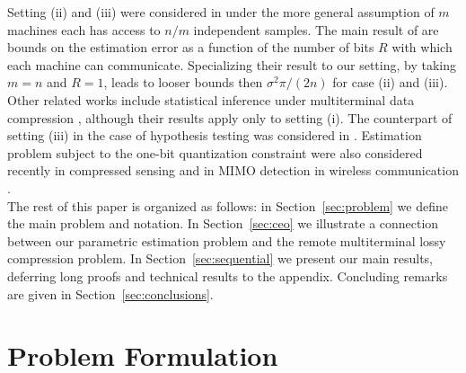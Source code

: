 \documentclass[letterpaper, conference]{IEEEtran}      %
\begin{document}
Setting (ii) and (iii) were considered in 
\cite{zhang2013information} under the more general assumption of $m$ machines each has access to $n/m$ independent samples. The main result of \cite{zhang2013information} are bounds on the estimation error as a function of the number of bits $R$ with which each machine can communicate. Specializing their result to our setting, by taking $m=n$ and $R=1$, leads to looser bounds then $\sigma^2\pi/(2n)$ for case (ii) and (iii). 
Other related works include statistical inference under multiterminal data compression \cite{han1987hypothesis, zhang1988estimation}, although their results apply only to setting (i). The counterpart of setting (iii) in the case of hypothesis testing was considered in \cite{52470}.
%
Estimation problem subject to the one-bit quantization constraint were also considered recently in compressed sensing \cite{boufounos20081,baraniuk2017exponential} and in MIMO detection in wireless communication \cite{singh2009limits}. \\

The rest of this paper is organized as follows: in Section~\ref{sec:problem} we define 
the main problem and notation. In Section~\ref{sec:ceo} we illustrate a connection between our parametric estimation problem and the remote multiterminal lossy compression problem. In Section~\ref{sec:sequential} we present our main results, deferring long proofs and technical results to the appendix. Concluding remarks are given in Section~\ref{sec:conclusions}. 

\section{Problem Formulation \label{sec:problem}}
\end{document}
